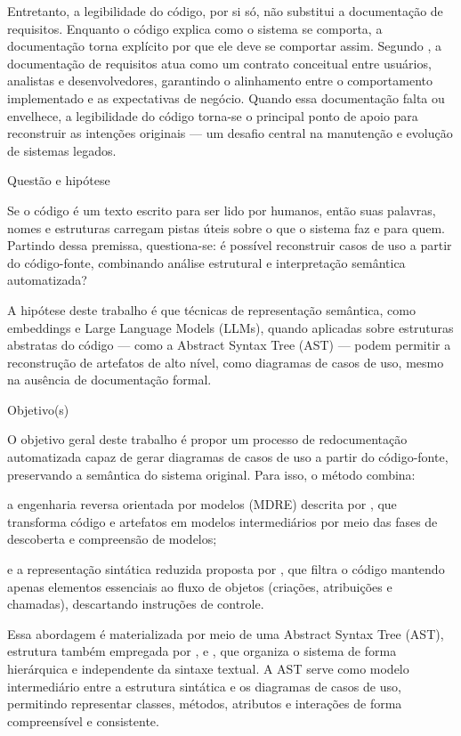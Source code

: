 \documentclass[12pt,a4paper]{article}
\begin{document}
Entretanto, a legibilidade do código, por si só, não substitui a documentação de requisitos. Enquanto o código explica como o sistema se comporta, a documentação torna explícito por que ele deve se comportar assim. Segundo \textcite{sommerville1997requirements}, a documentação de requisitos atua como um contrato conceitual entre usuários, analistas e desenvolvedores, garantindo o alinhamento entre o comportamento implementado e as expectativas de negócio. Quando essa documentação falta ou envelhece, a legibilidade do código torna-se o principal ponto de apoio para reconstruir as intenções originais — um desafio central na manutenção e evolução de sistemas legados.

Questão e hipótese

Se o código é um texto escrito para ser lido por humanos, então suas palavras, nomes e estruturas carregam pistas úteis sobre o que o sistema faz e para quem. Partindo dessa premissa, questiona-se: é possível reconstruir casos de uso a partir do código-fonte, combinando análise estrutural e interpretação semântica automatizada?

A hipótese deste trabalho é que técnicas de representação semântica, como embeddings e Large Language Models (LLMs), quando aplicadas sobre estruturas abstratas do código — como a Abstract Syntax Tree (AST) — podem permitir a reconstrução de artefatos de alto nível, como diagramas de casos de uso, mesmo na ausência de documentação formal.

Objetivo(s)

O objetivo geral deste trabalho é propor um processo de redocumentação automatizada capaz de gerar diagramas de casos de uso a partir do código-fonte, preservando a semântica do sistema original.
Para isso, o método combina:

a engenharia reversa orientada por modelos (MDRE) descrita por \textcite{Bruneliere2010MoDisco}, que transforma código e artefatos em modelos intermediários por meio das fases de descoberta e compreensão de modelos;

e a representação sintática reduzida proposta por \textcite{tonella2007reverse}, que filtra o código mantendo apenas elementos essenciais ao fluxo de objetos (criações, atribuições e chamadas), descartando instruções de controle.

Essa abordagem é materializada por meio de uma Abstract Syntax Tree (AST), estrutura também empregada por \textcite{pereira2011recovering}, \textcite{Wang2006AST} e \textcite{Fauzi2016AST}, que organiza o sistema de forma hierárquica e independente da sintaxe textual. A AST serve como modelo intermediário entre a estrutura sintática e os diagramas de casos de uso, permitindo representar classes, métodos, atributos e interações de forma compreensível e consistente.
\end{document}
